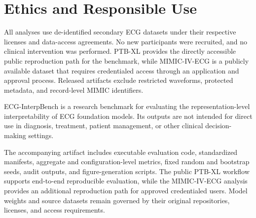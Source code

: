 \section{Ethics and Responsible Use}

All analyses use de-identified secondary ECG datasets under their respective licenses and data-access agreements. No new participants were recruited, and no clinical intervention was performed. PTB-XL provides the directly accessible public reproduction path for the benchmark, while MIMIC-IV-ECG is a publicly available dataset that requires credentialed access through an application and approval process. Released artifacts exclude restricted waveforms, protected metadata, and record-level MIMIC identifiers.

ECG-InterpBench is a research benchmark for evaluating the representation-level interpretability of ECG foundation models. Its outputs are not intended for direct use in diagnosis, treatment, patient management, or other clinical decision-making settings.

The accompanying artifact includes executable evaluation code, standardized manifests, aggregate and configuration-level metrics, fixed random and bootstrap seeds, audit outputs, and figure-generation scripts. The public PTB-XL workflow supports end-to-end reproducible evaluation, while the MIMIC-IV-ECG analysis provides an additional reproduction path for approved credentialed users. Model weights and source datasets remain governed by their original repositories, licenses, and access requirements.
